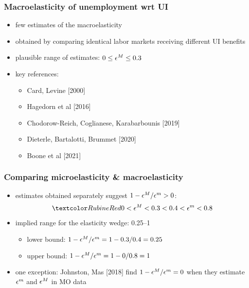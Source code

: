 \documentclass[12pt,xcolor={dvipsnames},hyperref={pdftex,pdfpagemode=UseNone,hidelinks,pdfdisplaydoctitle=true},usepdftitle=false]{beamer}
\begin{document}
\begin{frame}
\frametitle{Macroelasticity of unemployment wrt UI}
\begin{itemize}
\item few estimates of the macroelasticity
\item obtained by comparing identical labor markets receiving different UI benefits
\item plausible range of estimates: $0 \leq \epsilon^M \leq 0.3$
\item key references:
\begin{itemize}
\item Card, Levine [2000]
\item Hagedorn et al [2016]
\item Chodorow-Reich, Coglianese, Karabarbounis [2019]
\item Dieterle, Bartalotti, Brummet [2020]
\item Boone et al [2021]
\end{itemize}
\end{itemize}
\end{frame}

\begin{frame}
\frametitle{Comparing microelasticity \& macroelasticity}
\begin{itemize}
\item estimates obtained separately suggest $1-\epsilon^M/\epsilon^m>0$:
\begin{equation*}
\al{0< \e^M <0.3 <0.4 < \e^m<0.8}
\end{equation*}
\item implied range for the elasticity wedge: 0.25--1
\begin{itemize}
\item lower bound: $1-\epsilon^M/\epsilon^m = 1-0.3/0.4 = 0.25$
\item upper bound:  $1-\epsilon^M/\epsilon^m = 1-0/0.8 = 1$
\end{itemize}
\item one exception: Johnston, Mas [2018] find $1-\epsilon^M/\epsilon^m = 0$ when they estimate $\epsilon^m$ and $\epsilon^M$ in MO data
\end{itemize}
\end{frame}
\end{document}
